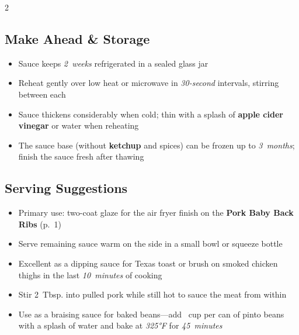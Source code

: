 \documentclass[11pt,letterpaper]{article}
\begin{document}
{\begin{multicols}{2}
\subsection*{Make Ahead \& Storage}
\begin{itemize}
    \item Sauce keeps \textit{2~weeks} refrigerated in a sealed glass jar
    \item Reheat gently over low heat or microwave in \textit{30-second} intervals, stirring between each
    \item Sauce thickens considerably when cold; thin with a splash of \textbf{apple cider vinegar} or water when reheating
    \item The sauce base (without \textbf{ketchup} and spices) can be frozen up to \textit{3~months}; finish the sauce fresh after thawing
\end{itemize}

\subsection*{Serving Suggestions}
\begin{itemize}
    \item Primary use: two-coat glaze for the air fryer finish on the \textbf{Pork Baby Back Ribs} (p.~1)
    \item Serve remaining sauce warm on the side in a small bowl or squeeze bottle
    \item Excellent as a dipping sauce for Texas toast or brush on smoked chicken thighs in the last \textit{10~minutes} of cooking
    \item Stir 2~Tbsp. into pulled pork while still hot to sauce the meat from within
    \item Use as a braising sauce for baked beans---add ~cup per can of pinto beans with a splash of water and bake at \textit{325°F} for \textit{45~minutes}
\end{itemize}

\end{multicols}
}
\end{document}
